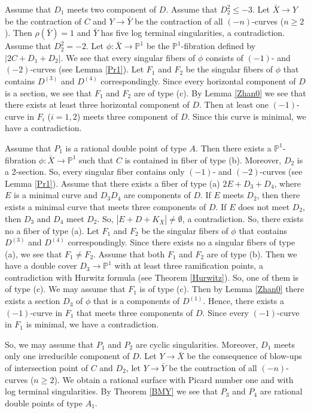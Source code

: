 \documentclass[10pt,oneside,reqno]{amsart}
\newcommand{\pp}{\mathbb{P}}
\theoremstyle{definition}
\theoremstyle{remark}
\numberwithin{equation}{section}
\begin{document}
Assume that $D_1$ meets two component of $D$. Assume that $D_2^2\leq -3$. Let $\bar{X}\rightarrow Y$ be the contraction of $C$ and $Y\rightarrow\bar{Y}$ be the contraction of all $(-n)$-curves ($n\geq 2$). Then $\rho(\bar{Y})=1$ and $\bar{Y}$ has five log terminal singularities, a contradiction. Assume that $D_2^2=-2$. Let $\phi\colon\bar{X}\rightarrow\pp^1$ be the $\pp^1$-fibration defined by $|2C+D_1+D_2|$. We see that every singular fibers of $\phi$ consists of $(-1)$- and $(-2)$-curves (see Lemma \ref{Pr1}). Let $F_1$ and $F_2$ be the singular fibers of $\phi$ that contains $D^{(3)}$ and $D^{(4)}$ correspondingly. Since every horizontal component of $D$ is a section, we see that $F_1$ and $F_2$ are of type (c). By Lemma \ref{Zhan0} we see that there exists at least three horizontal component of $D$. Then at least one $(-1)$-curve in $F_i$ ($i=1,2$) meets three component of $D$. Since this curve is minimal, we have a contradiction.

Assume that $P_1$ is a rational double point of type $A$.
Then there exists a $\pp^1$-fibration $\phi\colon\bar{X}\rightarrow\pp^1$ such that $C$ is contained in fiber of type (b). Moreover, $D_2$ is a 2-section. So, every singular fiber contains only $(-1)$- and $(-2)$-curves (see Lemma \ref{Pr1}). Assume that there exists a fiber of type (a) $2E+D_3+D_4$, where $E$ is a minimal curve and $D_3 D_4$ are components of $D$. If $E$ meets $D_2$, then there exists a minimal curve that meets three components of $D$. If $E$ does not meet $D_2$, then $D_3$ and $D_4$ meet $D_2$. So, $|E+D+K_{\bar{X}}|\neq \emptyset$, a contradiction. So, there exists no a fiber of type (a). Let $F_1$ and $F_2$ be the singular fibers of $\phi$ that contains $D^{(3)}$ and $D^{(4)}$ correspondingly. Since there exists no a singular fibers of type (a), we see that $F_1\neq F_2$. Assume that both $F_1$ and $F_2$ are of type (b). Then we have a double cover $D_3\rightarrow\pp^1$ with at least three ramification points, a contradiction with Hurwitz formula (see Theorem \ref{Hurwitz}). So, one of them is of type (c). We may assume that $F_1$ is of type (c). Then by Lemma \ref{Zhan0} there exists a section $D_3$ of $\phi$ that is a components of $D^{(1)}$. Hence, there exists a $(-1)$-curve in $F_1$ that meets three components of $D$. Since every $(-1)$-curve in $F_1$ is minimal, we have a contradiction.

So, we may assume that $P_1$ and $P_2$ are cyclic singularities. Moreover, $D_1$ meets only one irreducible component of $D$. Let $Y\rightarrow\bar{X}$ be the consequence of blow-ups of intersection point of $C$ and $D_2$, let $Y\rightarrow\bar{Y}$ be the contraction of all $(-n)$-curves ($n\geq 2$). We obtain a rational surface with Picard number one and with log terminal singularities. By Theorem \ref{BMY} we see that $P_3$ and $P_4$ are rational double points of type $A_1$.
\end{document}

